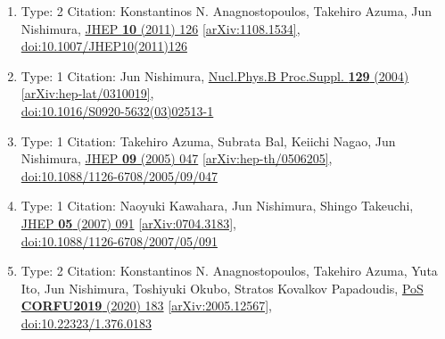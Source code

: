 \documentclass[a4paper,10pt]{article}
\begin{document}
\begin{enumerate}
\begin{enumerate}
  \item Type: 2 Citation: Konstantinos N. Anagnostopoulos, Takehiro Azuma, Jun Nishimura, \href{https://www.doi.org/10.1007/JHEP10(2011)126}{JHEP {\bf 10} (2011) 126}  \href{https://arxiv.org/abs/1108.1534}{[arXiv:1108.1534]},\\\href{https://www.doi.org/10.1007/JHEP10(2011)126}{doi:10.1007/JHEP10(2011)126}
  \item Type: 1 Citation: Jun Nishimura, \href{https://www.doi.org/10.1016/S0920-5632(03)02513-1}{Nucl.Phys.B Proc.Suppl. {\bf 129} (2004) }  \href{https://arxiv.org/abs/hep-lat/0310019}{[arXiv:hep-lat/0310019]},\\\href{https://www.doi.org/10.1016/S0920-5632(03)02513-1}{doi:10.1016/S0920-5632(03)02513-1}
  \item Type: 1 Citation: Takehiro Azuma, Subrata Bal, Keiichi Nagao, Jun Nishimura, \href{https://www.doi.org/10.1088/1126-6708/2005/09/047}{JHEP {\bf 09} (2005) 047}  \href{https://arxiv.org/abs/hep-th/0506205}{[arXiv:hep-th/0506205]},\\\href{https://www.doi.org/10.1088/1126-6708/2005/09/047}{doi:10.1088/1126-6708/2005/09/047}
  \item Type: 1 Citation: Naoyuki Kawahara, Jun Nishimura, Shingo Takeuchi, \href{https://www.doi.org/10.1088/1126-6708/2007/05/091}{JHEP {\bf 05} (2007) 091}  \href{https://arxiv.org/abs/0704.3183}{[arXiv:0704.3183]},\\\href{https://www.doi.org/10.1088/1126-6708/2007/05/091}{doi:10.1088/1126-6708/2007/05/091}
  \item Type: 2 Citation: Konstantinos N. Anagnostopoulos, Takehiro Azuma, Yuta Ito, Jun Nishimura, Toshiyuki Okubo, Stratos Kovalkov Papadoudis, \href{https://www.doi.org/10.22323/1.376.0183}{PoS {\bf CORFU2019} (2020) 183}  \href{https://arxiv.org/abs/2005.12567}{[arXiv:2005.12567]},\\\href{https://www.doi.org/10.22323/1.376.0183}{doi:10.22323/1.376.0183}

\end{enumerate}
\end{enumerate}
\end{document}
